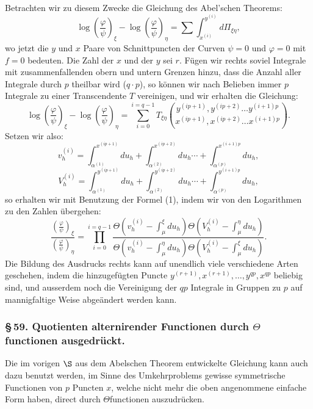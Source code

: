 \documentclass[10pt]{article}
\begin{document}
Betrachten wir zu diesem Zwecke die Gleichung des Abel'schen Theorems:
\[
\log\left(\frac{\varphi}{\psi}\right)_{\xi}-\log\left(\frac{\varphi}{\psi}\right)_{\eta}
=\sum\int_{x^{(i)}}^{y^{(i)}}d\Pi_{\xi\eta},
\]
wo jetzt die \(y\) und \(x\) Paare von Schnittpuncten der Curven \(\psi=0\) und \(\varphi=0\) mit \(f=0\) bedeuten. Die Zahl der \(x\) und der \(y\) sei \(r\). Fügen wir rechts soviel Integrale mit zusammenfallenden obern und untern Grenzen hinzu, dass die Anzahl aller Integrale durch \(p\) theilbar wird (\(q\cdot p\)), so können wir nach Belieben immer \(p\) Integrale zu einer Transcendente \(T\) vereinigen, und wir erhalten die Gleichung:
\[
\log\left(\frac{\varphi}{\psi}\right)_{\xi}-\log\left(\frac{\varphi}{\psi}\right)_{\eta}
=\sum_{i=0}^{i=q-1}
T_{\xi\eta}\binom{y^{(ip+1)},y^{(ip+2)}\ldots y^{(i+1)p}}
{x^{(ip+1)},x^{(ip+2)}\ldots x^{(i+1)p}}.
\]
Setzen wir also:
\[
v_h^{(i)}=\int_{\alpha^{(1)}}^{x^{(ip+1)}}du_h+\int_{\alpha^{(2)}}^{x^{(ip+2)}}du_h\cdots+\int_{\alpha^{(p)}}^{x^{(i+1)p}}du_h,
\]
\[
V_h^{(i)}=\int_{\alpha^{(1)}}^{y^{(ip+1)}}du_h+\int_{\alpha^{(2)}}^{y^{(ip+2)}}du_h\cdots+\int_{\alpha^{(p)}}^{y^{(i+1)p}}du_h,
\]
so erhalten wir mit Benutzung der Formel (1), indem wir von den Logarithmen zu den Zahlen übergehen:
\[
\frac{\left(\frac{\varphi}{\psi}\right)_{\xi}}
{\left(\frac{\varphi}{\psi}\right)_{\eta}}
=
\prod_{i=0}^{i=q-1}
\frac{
\Theta\!\left(v_h^{(i)}-\int_{\mu}^{\xi}du_h\right)
\Theta\!\left(V_h^{(i)}-\int_{\mu}^{\eta}du_h\right)}
{\Theta\!\left(v_h^{(i)}-\int_{\mu}^{\eta}du_h\right)
\Theta\!\left(V_h^{(i)}-\int_{\mu}^{\xi}du_h\right)}.
\]
Die Bildung des Ausdrucks rechts kann auf unendlich viele verschiedene Arten geschehen, indem die hinzugefügten Puncte \(y^{(r+1)},x^{(r+1)},\ldots,y^{q p},x^{q p}\) beliebig sind, und ausserdem noch die Vereinigung der \(q p\) Integrale in Gruppen zu \(p\) auf mannigfaltige Weise abgeändert werden kann.

\subsubsection*{\S\,59. Quotienten alternirender Functionen durch \(\Theta\)functionen ausgedrückt.}

Die im vorigen \(\S\) aus dem Abelschen Theorem entwickelte Gleichung kann auch dazu benutzt werden, im Sinne des Umkehrproblems gewisse symmetrische Functionen von \(p\) Puncten \(x\), welche nicht mehr die oben angenommene einfache Form haben, direct durch \(\Theta\)functionen auszudrücken.
\end{document}
